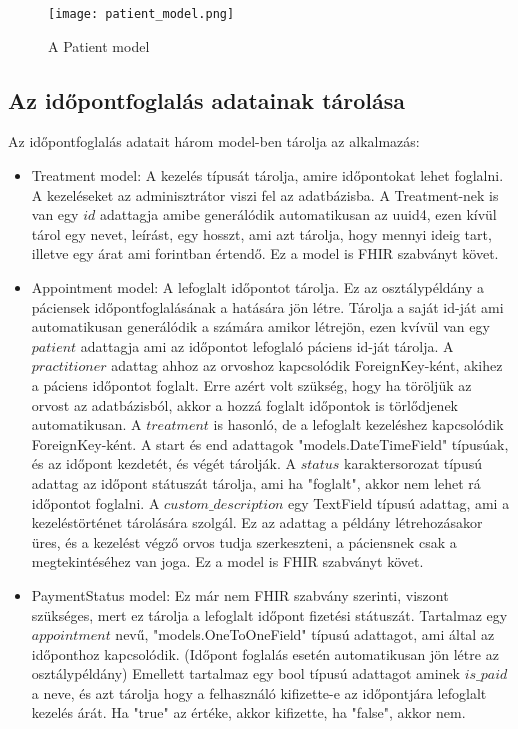 \begin{figure}[!htbp]
	\caption{A Patient model}
	\label{fig:patientmodel}
	\centering
	\texttt{[image: patient\_model.png]}
\end{figure}

\subsection{Az időpontfoglalás adatainak tárolása}

Az időpontfoglalás adatait három model-ben tárolja az alkalmazás:

\begin{itemize}
	\item Treatment model: A kezelés típusát tárolja, amire időpontokat lehet foglalni. A kezeléseket az adminisztrátor viszi fel az adatbázisba. A Treatment-nek is van egy $id$ adattagja amibe generálódik automatikusan az uuid4, ezen kívül tárol egy nevet, leírást, egy hosszt, ami azt tárolja, hogy mennyi ideig tart, illetve egy árat ami forintban értendő. Ez a model is FHIR szabványt követ.
	\item Appointment model: A lefoglalt időpontot tárolja. Ez az osztálypéldány a páciensek időpontfoglalásának a hatására jön létre. Tárolja a saját id-ját ami automatikusan generálódik a számára amikor létrejön, ezen kvívül van egy $patient$ adattagja ami az időpontot lefoglaló páciens id-ját tárolja. A $practitioner$ adattag ahhoz az orvoshoz kapcsolódik ForeignKey-ként, akihez a páciens időpontot foglalt. Erre azért volt szükség, hogy ha töröljük az orvost az adatbázisból, akkor a hozzá foglalt időpontok is törlődjenek automatikusan. A $treatment$ is hasonló, de a lefoglalt kezeléshez kapcsolódik ForeignKey-ként. A start és end adattagok "models.DateTimeField" típusúak, és az időpont kezdetét, és végét tárolják. A $status$ karaktersorozat típusú adattag az időpont státuszát tárolja, ami ha "foglalt", akkor nem lehet rá időpontot foglalni. A $custom\_description$ egy TextField típusú adattag, ami a kezeléstörténet tárolására szolgál. Ez az adattag a példány létrehozásakor üres, és a kezelést végző orvos tudja szerkeszteni, a páciensnek csak a megtekintéséhez van joga. Ez a model is FHIR szabványt követ.
	\item PaymentStatus model: Ez már nem FHIR szabvány szerinti, viszont szükséges, mert ez tárolja a lefoglalt időpont fizetési státuszát. Tartalmaz egy $appointment$ nevű, "models.OneToOneField" típusú adattagot, ami által az időponthoz kapcsolódik. (Időpont foglalás esetén automatikusan jön létre az osztálypéldány) Emellett tartalmaz egy bool típusú adattagot aminek $is\_paid$ a neve, és azt tárolja hogy a felhasználó kifizette-e az időpontjára lefoglalt kezelés árát. Ha "true" az értéke, akkor kifizette, ha "false", akkor nem.
\end{itemize}

